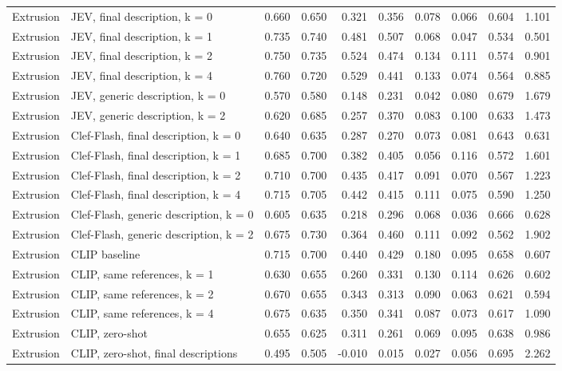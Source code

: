 \begin{table}
\begin{tabular}[t]{llrrrrrrrr}
Extrusion & JEV, final description, k = 0 & 0.660 & 0.650 & 0.321 & 0.356 & 0.078 & 0.066 & 0.604 & 1.101\\
Extrusion & JEV, final description, k = 1 & 0.735 & 0.740 & 0.481 & 0.507 & 0.068 & 0.047 & 0.534 & 0.501\\
\addlinespace
Extrusion & JEV, final description, k = 2 & 0.750 & 0.735 & 0.524 & 0.474 & 0.134 & 0.111 & 0.574 & 0.901\\
Extrusion & JEV, final description, k = 4 & 0.760 & 0.720 & 0.529 & 0.441 & 0.133 & 0.074 & 0.564 & 0.885\\
Extrusion & JEV, generic description, k = 0 & 0.570 & 0.580 & 0.148 & 0.231 & 0.042 & 0.080 & 0.679 & 1.679\\
Extrusion & JEV, generic description, k = 2 & 0.620 & 0.685 & 0.257 & 0.370 & 0.083 & 0.100 & 0.633 & 1.473\\
Extrusion & Clef-Flash, final description, k = 0 & 0.640 & 0.635 & 0.287 & 0.270 & 0.073 & 0.081 & 0.643 & 0.631\\
\addlinespace
Extrusion & Clef-Flash, final description, k = 1 & 0.685 & 0.700 & 0.382 & 0.405 & 0.056 & 0.116 & 0.572 & 1.601\\
Extrusion & Clef-Flash, final description, k = 2 & 0.710 & 0.700 & 0.435 & 0.417 & 0.091 & 0.070 & 0.567 & 1.223\\
Extrusion & Clef-Flash, final description, k = 4 & 0.715 & 0.705 & 0.442 & 0.415 & 0.111 & 0.075 & 0.590 & 1.250\\
Extrusion & Clef-Flash, generic description, k = 0 & 0.605 & 0.635 & 0.218 & 0.296 & 0.068 & 0.036 & 0.666 & 0.628\\
Extrusion & Clef-Flash, generic description, k = 2 & 0.675 & 0.730 & 0.364 & 0.460 & 0.111 & 0.092 & 0.562 & 1.902\\
\addlinespace
Extrusion & CLIP baseline & 0.715 & 0.700 & 0.440 & 0.429 & 0.180 & 0.095 & 0.658 & 0.607\\
Extrusion & CLIP, same references, k = 1 & 0.630 & 0.655 & 0.260 & 0.331 & 0.130 & 0.114 & 0.626 & 0.602\\
Extrusion & CLIP, same references, k = 2 & 0.670 & 0.655 & 0.343 & 0.313 & 0.090 & 0.063 & 0.621 & 0.594\\
Extrusion & CLIP, same references, k = 4 & 0.675 & 0.635 & 0.350 & 0.341 & 0.087 & 0.073 & 0.617 & 1.090\\
Extrusion & CLIP, zero-shot & 0.655 & 0.625 & 0.311 & 0.261 & 0.069 & 0.095 & 0.638 & 0.986\\
\addlinespace
Extrusion & CLIP, zero-shot, final descriptions & 0.495 & 0.505 & -0.010 & 0.015 & 0.027 & 0.056 & 0.695 & 2.262\\

\end{tabular}
\end{table}
